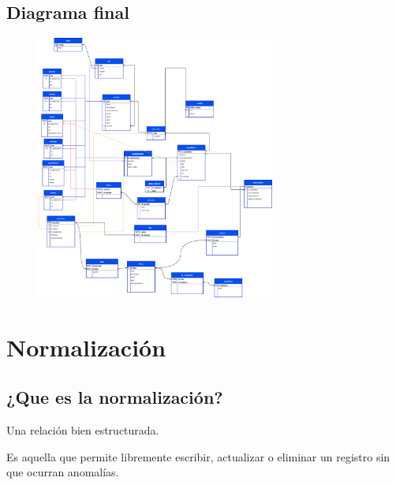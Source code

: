 \documentclass[12pt, fleqn]{report}                             %
\theoremstyle{break}                                            %
\begin{document}
      \section{Diagrama final}

        \begin{figure}[ht]
            \includegraphics[width=0.7\textwidth]{Relacional}
        \end{figure}

    \chapter{Normalización}

    \section{¿Que es la normalización?}

        Una relación bien estructurada.

        Es aquella que permite libremente escribir, actualizar o eliminar un registro sin que
        ocurran anomalías.
\end{document}
